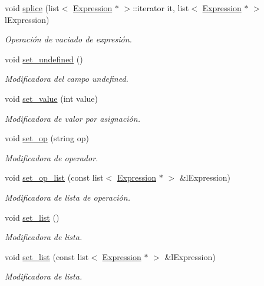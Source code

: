 \begin{DoxyCompactItemize}
void \hyperlink{class_expression_afcd885fc3562809ede2796b722bb4854}{splice} (list$<$ \hyperlink{class_expression}{Expression} $\ast$ $>$\+::iterator it, list$<$ \hyperlink{class_expression}{Expression} $\ast$ $>$ l\+Expression)
\begin{DoxyCompactList}\small\item\em Operación de vaciado de expresión. \end{DoxyCompactList}\item 
void \hyperlink{class_expression_a1d3ddfe83d20f47930792807e8b22248}{set\+\_\+undefined} ()
\begin{DoxyCompactList}\small\item\em Modificadora del campo undefined. \end{DoxyCompactList}\item 
void \hyperlink{class_expression_a307683cc3735bf81d823931aab2d64e0}{set\+\_\+value} (int value)
\begin{DoxyCompactList}\small\item\em Modificadora de valor por asignación. \end{DoxyCompactList}\item 
void \hyperlink{class_expression_adffd3a10200510c64055e550e9eebb1f}{set\+\_\+op} (string op)
\begin{DoxyCompactList}\small\item\em Modificadora de operador. \end{DoxyCompactList}\item 
void \hyperlink{class_expression_a1c3e554b2d82446c8f1322fb7812e9cc}{set\+\_\+op\+\_\+list} (const list$<$ \hyperlink{class_expression}{Expression} $\ast$ $>$ \&l\+Expression)
\begin{DoxyCompactList}\small\item\em Modificadora de lista de operación. \end{DoxyCompactList}\item 
void \hyperlink{class_expression_a66db516be4fa87d58df4806938676508}{set\+\_\+list} ()
\begin{DoxyCompactList}\small\item\em Modificadora de lista. \end{DoxyCompactList}\item 
void \hyperlink{class_expression_af424140108512e290c5cef0da96b2e51}{set\+\_\+list} (const list$<$ \hyperlink{class_expression}{Expression} $\ast$ $>$ \&l\+Expression)
\begin{DoxyCompactList}\small\item\em Modificadora de lista. \end{DoxyCompactList}\item 

\end{DoxyCompactItemize}
